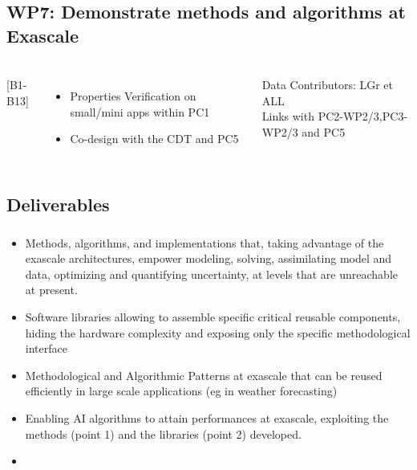 \subsection{WP7: Demonstrate methods and algorithms at Exascale}
\begin{frame}
  \frametitle{\insertsectionhead}
  \framesubtitle{\insertsubsectionhead}

  \begin{columns}
    [B1-B13]
    \begin{itemize}
      \item Properties Verification on small/mini apps within PC1
      \item Co-design with the CDT and PC5
    \end{itemize}
    \begin{alertblock}{Data }
      Contributors: LGr et ALL\\
      Links with PC2-WP2/3,PC3-WP2/3 and PC5
    \end{alertblock}
   
  \end{columns}
\end{frame}

\subsection{Deliverables}

\begin{frame}
  \frametitle{\insertsectionhead}
  \framesubtitle{\insertsubsectionhead}
  \begin{itemize}
      \item   Methods, algorithms, and implementations that, taking advantage of the exascale architectures, empower modeling, solving, assimilating model and data, optimizing and quantifying uncertainty, at levels that are unreachable at present.
    \item Software libraries allowing to assemble specific critical reusable components, hiding the hardware complexity and exposing only the specific methodological interface
    \item Methodological and Algorithmic Patterns at exascale that can be reused efficiently in large scale applications (eg in weather forecasting)
    \item Enabling AI algorithms to attain performances at exascale, exploiting the methods (point 1) and the libraries (point 2) developed.
    \item \href{https://docs.google.com/document/d/1hjwSFRF63SyTUJJKGMNLHcJPr_S2JDHYXeBeQzHCSno/edit?usp=sharing}{}

  \end{itemize}


\end{frame}

